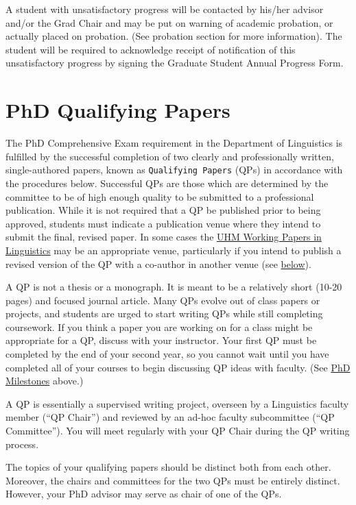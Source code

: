 \documentclass[
]{book}
\begin{document}
A student with unsatisfactory progress will be contacted by his/her advisor and/or the Grad Chair and may be put on warning of academic probation, or actually placed on probation. (See probation section for more information). The student will be required to acknowledge receipt of notification of this unsatisfactory progress by signing the Graduate Student Annual Progress Form.

\chapter{PhD Qualifying Papers}\label{qp}

The PhD Comprehensive Exam requirement in the Department of Linguistics is fulfilled by the successful completion of two clearly and professionally written, single-authored papers, known as \texttt{Qualifying\ Papers} (QPs) in accordance with the procedures below. Successful QPs are those which are determined by the committee to be of high enough quality to be submitted to a professional publication. While it is not required that a QP be published prior to being approved, students must indicate a publication venue where they intend to submit the final, revised paper. In some cases the \hyperref[wp]{UHM Working Papers in Linguistics} may be an appropriate venue, particularly if you intend to publish a revised version of the QP with a co-author in another venue (see \hyperref[wp]{below}).

A QP is not a thesis or a monograph. It is meant to be a relatively short (10-20 pages) and focused journal article. Many QPs evolve out of class papers or projects, and students are urged to start writing QPs while still completing coursework. If you think a paper you are working on for a class might be appropriate for a QP, discuss with your instructor. Your first QP must be completed by the end of your second year, so you cannot wait until you have completed all of your courses to begin discussing QP ideas with faculty. (See \hyperref[phdprogram]{PhD Milestones} above.)

A QP is essentially a supervised writing project, overseen by a Linguistics faculty member (``QP Chair'') and reviewed by an ad-hoc faculty subcommittee (``QP Committee''). You will meet regularly with your QP Chair during the QP writing process.

The topics of your qualifying papers should be distinct both from each other. Moreover, the chairs and committees for the two QPs must be entirely distinct. However, your PhD advisor may serve as chair of one of the QPs.
\end{document}
